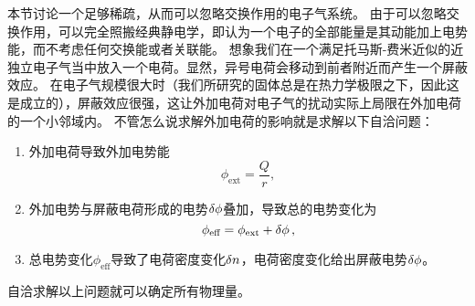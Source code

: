 \documentclass[hyperref, UTF8, a4paper]{ctexart}
\begin{document}
本节讨论一个足够稀疏，从而可以忽略交换作用的电子气系统。
由于可以忽略交换作用，可以完全照搬经典静电学，即认为一个电子的全部能量是其动能加上电势能，而不考虑任何交换能或者关联能。
想象我们在一个满足托马斯-费米近似的近独立电子气当中放入一个电荷。显然，异号电荷会移动到前者附近而产生一个屏蔽效应。
在电子气规模很大时（我们所研究的固体总是在热力学极限之下，因此这是成立的），屏蔽效应很强，这让外加电荷对电子气的扰动实际上局限在外加电荷的一个小邻域内。
不管怎么说求解外加电荷的影响就是求解以下自洽问题：
\begin{enumerate}
    \item 外加电荷导致外加电势能
    \begin{equation}
        \phi_\text{ext} = \frac{Q}{r},
    \end{equation}
    \item 外加电势与屏蔽电荷形成的电势$\var{\phi}$叠加，导致总的电势变化为
    \begin{equation}
        \phi_\text{eff} = \phi_\text{ext} + \var{\phi},
    \end{equation}
    \item 总电势变化$\phi_\text{eff}$导致了电荷密度变化$\var{n}$，电荷密度变化给出屏蔽电势$\var{\phi}$。
\end{enumerate}
自洽求解以上问题就可以确定所有物理量。
\end{document}
